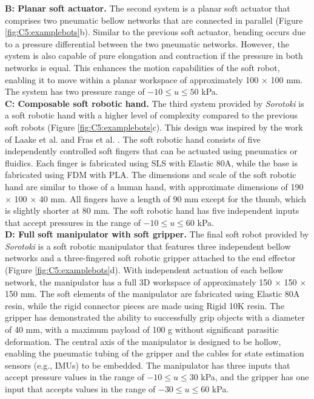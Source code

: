 \textbf{B: Planar soft actuator.} The second system is a planar soft actuator that comprises two pneumatic bellow networks that are connected in parallel (Figure \ref{fig:C5:examplebots}b). Similar to the previous soft actuator, bending occurs due to a pressure differential between the two pneumatic networks. However, the system is also capable of pure elongation and contraction if the pressure in both networks is equal. This enhances the motion capabilities of the soft robot, enabling it to move within a planar workspace of approximately 100 $\times$ 100 mm. The system has two pressure range of $-10 \le u \le 50$ kPa. \\

\textbf{C: Composable soft robotic hand.} The third system provided by \textit{Sorotoki} is a soft robotic hand with a higher level of complexity compared to the previous soft robots (Figure \ref{fig:C5:examplebots}c). This design was inspired by the work of Laake et al. \cite{vanLaake2022Sep} and Fras et al. \cite{Fras2018Oct}. The soft robotic hand consists of five independently controlled soft fingers that can be actuated using pneumatics or fluidics. Each finger is fabricated using SLS with Elastic 80A, while the base is fabricated using FDM with PLA. The dimensions and scale of the soft robotic hand are similar to those of a human hand, with approximate dimensions of 190 $\times$ 100 $\times$ 40 mm. All fingers have a length of 90 mm except for the thumb, which is slightly shorter at 80 mm. The soft robotic hand has five independent inputs that accept pressures in the range of $-10 \le u \le 60$ kPa. \\

\textbf{D: Full soft manipulator with soft gripper.}
The final soft robot provided by \textit{Sorotoki} is a soft robotic manipulator that features three independent bellow networks and a three-fingered soft robotic gripper attached to the end effector (Figure \ref{fig:C5:examplebots}d). With independent actuation of each bellow network, the manipulator has a full 3D workspace of approximately 150 $\times$ 150 $\times$ 150 \si{\milli \meter}. The soft elements of the manipulator are fabricated using Elastic 80A resin, while the rigid connector pieces are made using Rigid 10K resin. The gripper has demonstrated the ability to successfully grip objects with a diameter of 40 \si{\milli \meter}, with a maximum payload of 100 \si{\gram} without significant parasitic deformation. The central axis of the manipulator is designed to be hollow, enabling the pneumatic tubing of the gripper and the cables for state estimation sensors (e.g., IMUs) to be embedded. The manipulator has three inputs that accept pressure values in the range of $-10 \le u \le 30$ kPa, and the gripper has one input that accepts values in the range of $-30 \le u \le 60$ kPa. \\

